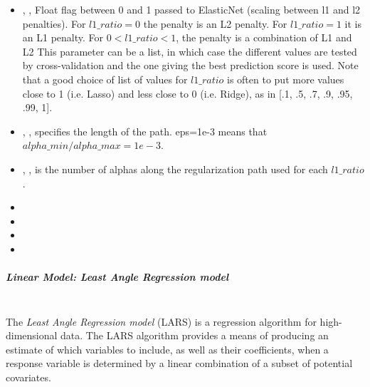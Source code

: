 \begin{itemize}
  \item {}, ,
  Float flag between 0 and 1 passed to ElasticNet (scaling between l1 and l2
  penalties).
  For $l1\_ratio = 0$ the penalty is an L2 penalty.
  For $l1\_ratio = 1$ it is an L1 penalty.
  For $0 < l1\_ratio < 1$, the penalty is a combination of L1 and L2 This
  parameter can be a list, in which case the different values are tested by
  cross-validation and the one giving the best prediction score is used.
  Note that a good choice of list of values for $l1\_ratio$ is often to put more
  values close to 1 (i.e. Lasso) and less close to 0 (i.e. Ridge), as in [.1,
  .5, .7, .9, .95, .99, 1].
  \item {}, , specifies the length of 
  the path.
  eps=1e-3 means that $alpha\_min / alpha\_max = 1e-3$.
  \item {}, , is the number of
  alphas along the regularization path used for each $l1\_ratio$.
  \item {}
  \item {}
  \item {}
  \item {}
\end{itemize}
\subparagraph{Linear Model: Least Angle Regression model}
\mbox{}
\\The \textit{Least Angle Regression model} (LARS) is a regression algorithm for
high-dimensional data.
%
The LARS algorithm provides a means of producing an estimate of which variables
to include, as well as their coefficients, when a response variable is
determined by a linear combination of a subset of potential covariates.
%

